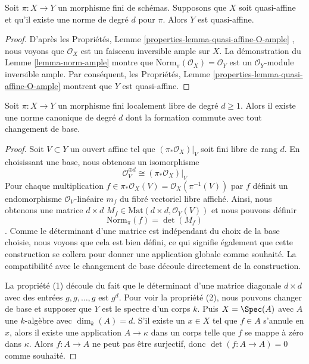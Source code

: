 \begin{lemma}
\label{lemma-norm-quasi-affine}
Soit  $\pi : X \to Y$  un morphisme fini de schémas. Supposons que  $X$  soit
quasi-affine et qu'il existe une norme de degré  $d$  pour  $\pi$.
Alors  $Y$  est quasi-affine.
\end{lemma}

\begin{proof}
D'après les Propriétés, Lemme  \ref{properties-lemma-quasi-affine-O-ample} , nous voyons que  $\mathcal{O}_X$  est un
faisceau inversible ample sur  $X$. La démonstration du Lemme  \ref{lemma-norm-ample} 
montre que  $\text{Norm}_\pi(\mathcal{O}_X) = \mathcal{O}_Y$  est un  $\mathcal{O}_Y$-module inversible ample. Par
conséquent, les Propriétés, Lemme  \ref{properties-lemma-quasi-affine-O-ample}  montrent que  $Y$  est
quasi-affine.
\end{proof}

\begin{lemma}
\label{lemma-finite-locally-free-has-norm}
Soit  $\pi : X \to Y$  un morphisme fini localement libre de degré  $d \geq 1$. Alors
il existe une norme canonique de degré  $d$  dont la formation commute avec
tout changement de base.
\end{lemma}

\begin{proof}
Soit  $V \subset Y$  un ouvert affine tel que  $(\pi_*\mathcal{O}_X)|_V$  soit fini libre de rang
 $d$. En choisissant une base, nous obtenons un isomorphisme
$$
\mathcal{O}_V^{\oplus d} \cong (\pi_*\mathcal{O}_X)|_V
$$
Pour chaque multiplication  $f \in \pi_*\mathcal{O}_X(V) = \mathcal{O}_X(\pi^{-1}(V))$  par  $f$  définit un endomorphisme
 $\mathcal{O}_V$-linéaire  $m_f$  du fibré vectoriel libre affiché. Ainsi, nous
obtenons une matrice  $d \times d$   $M_f \in \text{Mat}(d \times d, \mathcal{O}_Y(V))$  et nous pouvons définir
$$
\text{Norm}_\pi(f) = \det(M_f)
$$
. Comme le déterminant d'une matrice est indépendant du choix de la base choisie,
nous voyons que cela est bien défini, ce qui signifie également que cette
construction se collera pour donner une application globale comme souhaité. La
compatibilité avec le changement de base découle directement de la construction.

\medskip\noindent
La propriété (1) découle du fait que le déterminant d'une matrice diagonale
 $d \times d$  avec des entrées  $g, g, \ldots, g$  est  $g^d$. Pour voir la
propriété (2), nous pouvons changer de base et supposer que  $Y$  est le
spectre d'un corps  $k$. Puis  $X = \Spec(A)$  avec  $A$  une
 $k$-algèbre avec  $\dim_k(A) = d$. S'il existe un  $x \in X$  tel que
 $f \in A$  s'annule en  $x$, alors il existe une application
 $A \to \kappa$  dans un corps telle que  $f$  se mappe à zéro dans
 $\kappa$. Alors  $f : A \to A$  ne peut pas être surjectif, donc  $\det(f : A \to A) = 0$ 
comme souhaité.
\end{proof}

